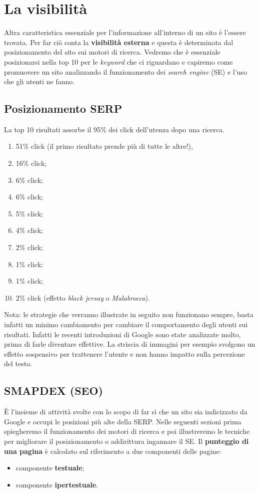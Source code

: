 
\chapter{La visibilità}
	Altra caratteristica essenziale per l'informazione all'interno di un sito è l'essere trovata. Per far ciò conta la \textbf{visibilità esterna} e questa è determinata dal posizionamento del sito sui motori di ricerca. 
	Vedremo che è essenziale posizionarsi nella top 10 per le \emph{keyword} che ci riguardano e capiremo come promuovere un sito analizzando il funzionamento dei \emph{search engine} (SE) e l'uso che gli utenti ne fanno.

	\section{Posizionamento SERP}	
		La top 10 risultati assorbe il 95\% dei click dell'utenza dopo una ricerca.
		\begin{enumerate}
			\item 51\% click (il primo risultato prende più di tutte le altre!),
			\item 16\% click;
			\item 6\% click;
			\item 6\% click;
			\item 5\% click;
			\item 4\% click;
			\item 2\% click;
			\item 1\% click;
			\item 1\% click;
			\item 2\% click (effetto \emph{black jersay} o \emph{Malabrocca}).		
		\end{enumerate}
		
		Nota: le strategie che verranno illustrate in seguito non funzionano sempre, basta infatti un minimo cambiamento per cambiare il comportamento degli utenti sui risultati. Infatti le recenti introduzioni di Google sono state analizzate molto, prima di farle diventare effettive. La striscia di immagini per esempio svolgono un effetto sospensivo per trattenere l'utente e non hanno impatto sulla percezione del testo.
	
	\section{SMAPDEX (SEO)}
		È l'insieme di attività svolte con lo scopo di far sì che un sito sia indicizzato da Google e occupi le posizioni più alte della SERP. Nelle seguenti sezioni prima spiegheremo il funzionamento dei motori di ricerca e poi illustreremo le tecniche per migliorare il posizionamento o addirittura ingannare il SE.
		Il \textbf{punteggio di una pagina} è calcolato sul riferimento a due componenti delle pagine:
		\begin{itemize}
			\item componente \textbf{testuale};
			\item componente \textbf{ipertestuale}.
		\end{itemize}
		
